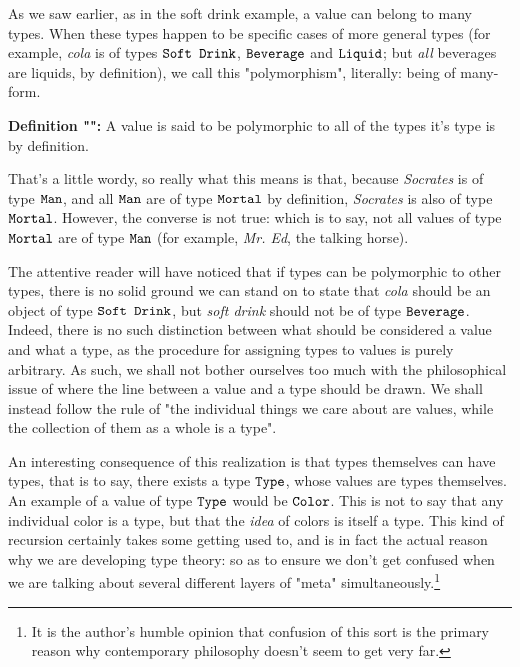 \documentclass[12pt]{book}
\renewcommand{\value}[1]{\textit{#1}}
\newcommand{\type}[1]{\text{\texttt{#1}}}
\newcommand{\what}{}
\newcommand{\defn}[2]{\renewcommand{\what}{#1}\textbf{Definition "\titlecap{#1}":} #2}
\begin{document}
As we saw earlier, as in the soft drink example, a value can belong to many types. When these types happen to be
specific cases of more general types (for example, \value{cola} is of types $\type{Soft Drink}$, $\type{Beverage}$ and
$\type{Liquid}$; but \textit{all} beverages are liquids, by definition), we call this "polymorphism", literally:
being of many-form.

\defn{polymorphism}{A value is said to be polymorphic to all of the types it's type is by definition.}

That's a little wordy, so really what this means is that, because \value{Socrates} is of type $\type{Man}$, and all
$\type{Man}$ are of type $\type{Mortal}$ by definition, \value{Socrates} is also of type $\type{Mortal}$. However, the
converse is not true: which is to say, not all values of type $\type{Mortal}$ are of type $\type{Man}$ (for example,
\value{Mr. Ed}, the talking horse).

The attentive reader will have noticed that if types can be polymorphic to other types, there is no solid ground we can
stand on to state that \value{cola} should be an object of type $\type{Soft Drink}$, but \value{soft drink} should not
be of type $\type{Beverage}$. Indeed, there is no such distinction between what should be considered a value and what a
type, as the procedure for assigning types to values is purely arbitrary. As
such, we shall not bother ourselves too much with the philosophical issue of where the line between a value and a type
should be drawn. We shall instead follow the rule of "the individual things we care about are values, while the
collection of them as a whole is a type".

An interesting consequence of this realization is that types themselves can have types, that is to say, there exists a
type $\type{Type}$, whose values are types themselves. An example of a value of type $\type{Type}$ would be
$\type{Color}$. This is not to say that any individual color is a type, but that the \textit{idea} of colors is itself a
type. This kind of recursion certainly takes some getting used to, and is in fact the actual reason why we are
developing type theory: so as to ensure we don't get confused when we are talking about several different layers of
"meta" simultaneously.\footnote{It is the author's humble opinion that confusion of this sort is the primary reason why
contemporary philosophy doesn't seem to get very far.}
\end{document}
